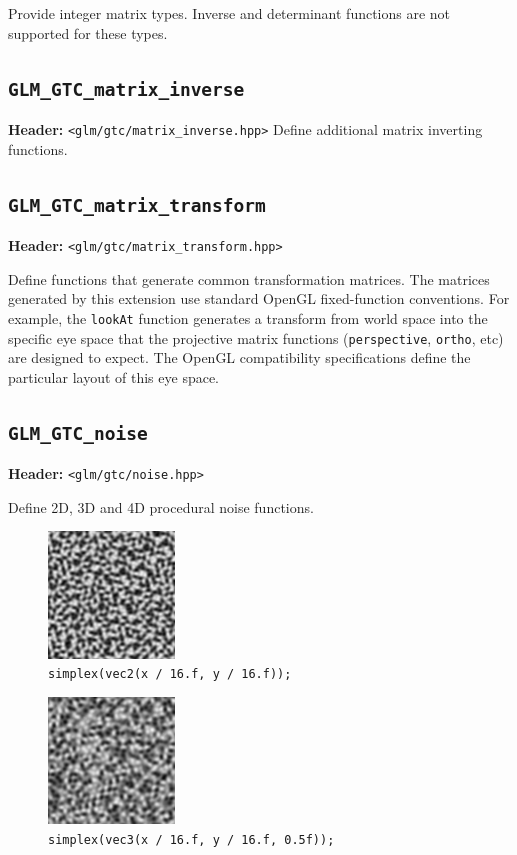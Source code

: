 \documentclass{scrartcl}
\numberwithin{figure}{subsection}
\begin{document}
Provide integer matrix types. Inverse and determinant functions are not supported for these types.

\subsection{\texttt{GLM\_GTC\_matrix\_inverse}}
\textbf{Header:} \verb|<glm/gtc/matrix_inverse.hpp>|
Define additional matrix inverting functions. 

\subsection{\texttt{GLM\_GTC\_matrix\_transform}}
\textbf{Header:} \verb|<glm/gtc/matrix_transform.hpp>|

Define functions that generate common transformation matrices.
The matrices generated by this extension use standard OpenGL fixed-function conventions. For example, the \verb|lookAt| function generates a transform from world space into the specific eye space that the projective matrix functions (\verb|perspective|, \verb|ortho|, etc) are designed to expect. The OpenGL compatibility specifications define the particular layout of this eye space.

\subsection{\texttt{GLM\_GTC\_noise}}
\textbf{Header:} \verb|<glm/gtc/noise.hpp>|

Define 2D, 3D and 4D procedural noise functions.

\begin{figure}
  \centering
  \includegraphics[width=0.3\textwidth]{simplex1}
  \cprotect\caption{\verb|simplex(vec2(x / 16.f, y / 16.f));|}
\end{figure}

\begin{figure}
  \centering
  \includegraphics[width=0.3\textwidth]{simplex2}
  \cprotect\caption{\verb|simplex(vec3(x / 16.f, y / 16.f, 0.5f));|}
\end{figure}
\end{document}

